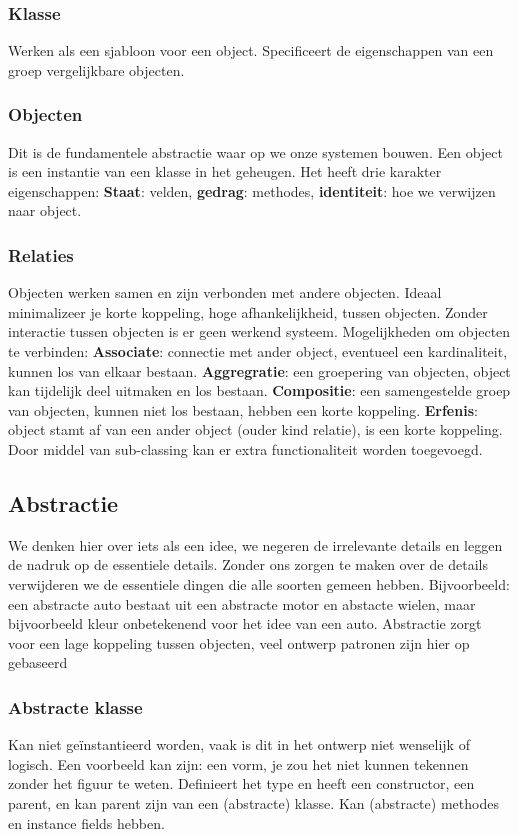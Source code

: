 \subsubsection{Klasse}
Werken als een sjabloon voor een object.
Specificeert de eigenschappen van een groep vergelijkbare objecten.

\subsubsection{Objecten}
Dit is de fundamentele abstractie waar op we onze systemen bouwen.
Een object is een instantie van een klasse in het geheugen.
Het heeft drie karakter eigenschappen: \textbf{Staat}: velden, \textbf{gedrag}: methodes, \textbf{identiteit}: hoe we verwijzen naar object.

\subsubsection{Relaties}
Objecten werken samen en zijn verbonden met andere objecten.
Ideaal minimalizeer je korte koppeling, hoge afhankelijkheid, tussen objecten.
Zonder interactie tussen objecten is er geen werkend systeem.
Mogelijkheden om objecten te verbinden:
\textbf{Associate}: connectie met ander object, eventueel een kardinaliteit, kunnen los van elkaar bestaan.
\textbf{Aggregratie}: een groepering van objecten, object kan tijdelijk deel uitmaken en los bestaan.
\textbf{Compositie}: een samengestelde groep van objecten, kunnen niet los bestaan, hebben een korte koppeling.
\textbf{Erfenis}: object stamt af van een ander object (ouder kind relatie), is een korte koppeling.
Door middel van sub-classing kan er extra functionaliteit worden toegevoegd.

\subsection{Abstractie}
We denken hier over iets als een idee, we negeren de irrelevante details en leggen de nadruk op de essentiele details.
Zonder ons zorgen te maken over de details verwijderen we de essentiele dingen die alle soorten gemeen hebben.
Bijvoorbeeld: een abstracte auto bestaat uit een abstracte motor en abstacte wielen, maar bijvoorbeeld kleur onbetekenend voor het idee van een auto.
Abstractie zorgt voor een lage koppeling tussen objecten, veel ontwerp patronen zijn hier op gebaseerd

\subsubsection{Abstracte klasse}
Kan niet geïnstantieerd worden, vaak is dit in het ontwerp niet wenselijk of logisch.
Een voorbeeld kan zijn: een vorm, je zou het niet kunnen tekennen zonder het figuur te weten.
Definieert het type en heeft een constructor, een parent, en kan parent zijn van een (abstracte) klasse.
Kan (abstracte) methodes en instance fields hebben.

